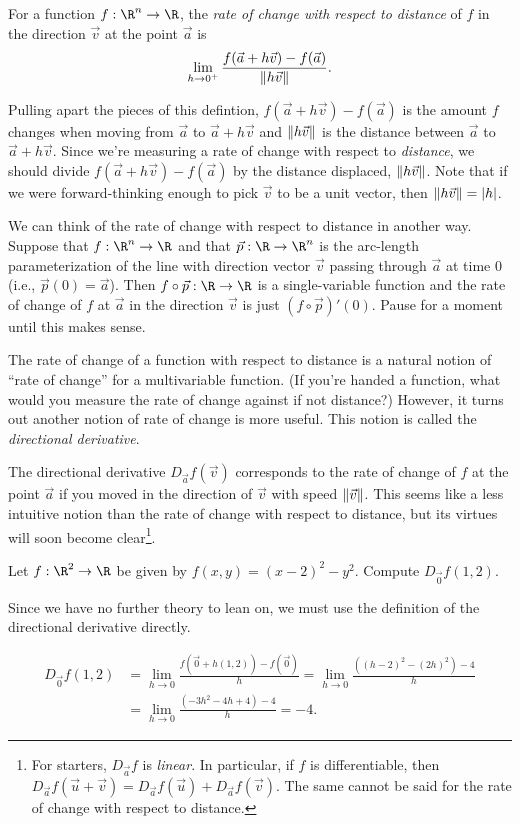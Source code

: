 \begin{definition}
	For a function $f:\R^n\to\R$, the \emph{rate of change with respect to distance} of $f$
	in the direction $\vec v$ at the point $\vec a$ is
	\[
		\lim_{h\to 0^+}\frac{f(\vec a+h\vec v)-f(\vec a)}{\lVert h\vec v\rVert}.
	\]
\end{definition}

Pulling apart the pieces of this defintion, $f(\vec a+h\vec v)-f(\vec a)$ is the amount $f$
changes when moving from $\vec a$ to $\vec a+h\vec v$ and $\lVert h\vec v\rVert$ is the distance between
$\vec a$ to $\vec a+h\vec v$.  Since we're measuring a rate of change with respect to \emph{distance},
we should divide $f(\vec a+h\vec v)-f(\vec a)$ by the distance displaced, $\lVert h\vec v\rVert$.  Note that if
we were forward-thinking
enough to pick $\vec v$ to be a unit vector, then $\lVert h\vec v\rVert=\lvert h\rvert$.

We can think of the rate of change with respect to distance in another way.  
Suppose that $f:\R^n\to \R$
and that $\vec p:\R\to\R^n$ is the arc-length parameterization of the line with direction
vector $\vec v$ passing through $\vec a$ at time $0$ (i.e., $\vec p(0)=\vec a$). 
Then $f\circ \vec p:\R\to\R$ is a single-variable
function and the rate of change of $f$ at $\vec a$ in the direction $\vec v$ is just $(f\circ\vec p)'(0)$.
Pause for a moment until this makes sense.

The rate of change of a function with respect to distance is a natural
notion of ``rate of change'' for a multivariable function.  (If you're handed a function, what
would you measure the rate of change against if not distance?)  However, it turns out 
another notion of rate of change is more useful.  This notion is called the 
\emph{directional derivative}.

\DefDirectionalDerivative

The directional derivative $D_{\vec a}f(\vec v)$ corresponds to the rate of change of $f$ at the point $\vec a$
if you moved in the direction of $\vec v$ with speed $\lVert\vec v\rVert$.  This seems 
like a less intuitive notion than the rate of change with respect to distance, but its virtues will
soon become clear\footnote{ For starters, $D_{\vec a}f$ is \emph{linear}.  In particular, if $f$ is differentiable,
then $D_{\vec a}f(\vec u+\vec v)=D_{\vec a}f(\vec u)+D_{\vec a}f(\vec v)$.  The same cannot
be said for the rate of change with respect to distance.}.

\begin{example}
	Let $f:\R^2\to\R$ be given by $f(x,y)=(x-2)^2-y^2$.  Compute $D_{\vec 0}f(1,2)$.

	Since we have no further theory to lean on, we must use the definition of the directional
	derivative directly.

	\begin{align*}
		D_{\vec 0}f(1,2) &= \lim_{h\to0}\frac{f(\vec 0+h(1,2))-f(\vec 0)}{h}
		=\lim_{h\to0}\frac{((h-2)^2-(2h)^2)-4}{h}\\
		&=\lim_{h\to0}\frac{(-3h^2-4h+4)-4}{h}=-4.
	\end{align*}
\end{example}

